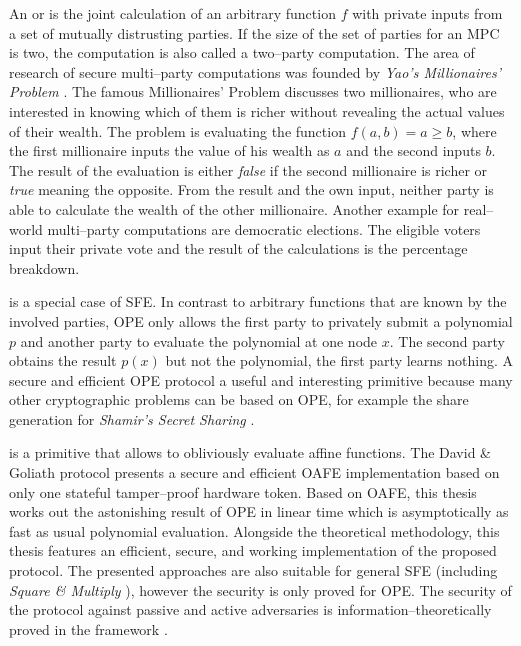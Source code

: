 \label{sec:introduction}

An  or  is the joint calculation of an arbitrary function $f$ with
private inputs from a set of mutually distrusting parties. If the size of the
set of parties for an MPC is two, the computation is also called a two--party
computation. The area of research of secure multi--party computations was
founded by \emph{Yao's Millionaires' Problem} \cite{yao82}. The famous
Millionaires' Problem discusses two millionaires, who are interested in knowing
which of them is richer without revealing the actual values of their wealth. The
problem is evaluating the function $f(a, b) = a \geq b$, where the first
millionaire inputs the value of his wealth as $a$ and the second inputs $b$. The
result of the evaluation is either \textit{false} if the second millionaire is
richer or \textit{true} meaning the opposite. From the result and the own input,
neither party is able to calculate the wealth of the other millionaire. Another
example for real--world multi--party computations are democratic elections. The
eligible voters input their private vote and the result of the calculations is
the percentage breakdown.

 \cite{naor99,naor06} is a special
case of SFE. In contrast to arbitrary functions that are known by the involved
parties, OPE only allows the first party to privately submit a polynomial $p$
and another party to evaluate the polynomial at one node $x$. The second party
obtains the result $p(x)$ but not the polynomial, the first party learns
nothing. A secure and efficient OPE protocol a useful and interesting primitive
because many other cryptographic problems can be based on OPE, for example the
share generation for \emph{Shamir's Secret Sharing} \cite{shamir79}.

 \cite{davidgoliath} is a
primitive that allows to obliviously evaluate affine functions. The David \&
Goliath protocol \cite{davidgoliath} presents a secure and efficient OAFE
implementation based on only one stateful tamper--proof hardware token. Based on
OAFE, this thesis works out the astonishing result of OPE in linear time which
is asymptotically as fast as usual polynomial evaluation. Alongside the
theoretical methodology, this thesis features an efficient, secure, and working
implementation of the proposed protocol. The presented approaches are also
suitable for general SFE (including \emph{Square \& Multiply} \cite{knuth81}),
however the security is only proved for OPE. The security of the protocol
against passive and active adversaries is in\-for\-ma\-tion--the\-o\-ret\-ically
proved in the  framework \cite{canetti05}.


